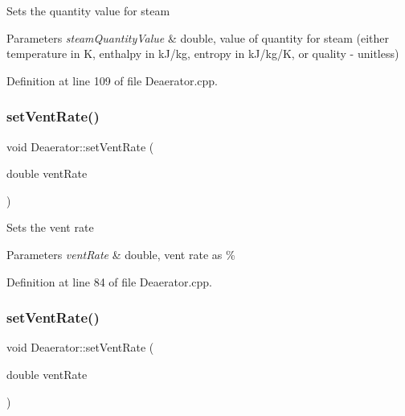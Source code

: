Sets the quantity value for steam 
\begin{DoxyParams}{Parameters}
{\em steam\+Quantity\+Value} & double, value of quantity for steam (either temperature in K, enthalpy in k\+J/kg, entropy in k\+J/kg/K, or quality -\/ unitless) \\
\hline
\end{DoxyParams}


Definition at line 109 of file Deaerator.\+cpp.

\mbox{\label{class_deaerator_a11e71194f58763a57ec0f7d05a21782d}} 
\subsubsection{\texorpdfstring{set\+Vent\+Rate()}{setVentRate()}\hspace{0.1cm}{\footnotesize\ttfamily [1/3]}}
{\footnotesize\ttfamily void Deaerator\+::set\+Vent\+Rate (\begin{DoxyParamCaption}\item[{double}]{vent\+Rate }\end{DoxyParamCaption})}

Sets the vent rate 
\begin{DoxyParams}{Parameters}
{\em vent\+Rate} & double, vent rate as \% \\
\hline
\end{DoxyParams}


Definition at line 84 of file Deaerator.\+cpp.

\mbox{\label{class_deaerator_a11e71194f58763a57ec0f7d05a21782d}} 
\subsubsection{\texorpdfstring{set\+Vent\+Rate()}{setVentRate()}\hspace{0.1cm}{\footnotesize\ttfamily [2/3]}}
{\footnotesize\ttfamily void Deaerator\+::set\+Vent\+Rate (\begin{DoxyParamCaption}\item[{double}]{vent\+Rate }\end{DoxyParamCaption})}

